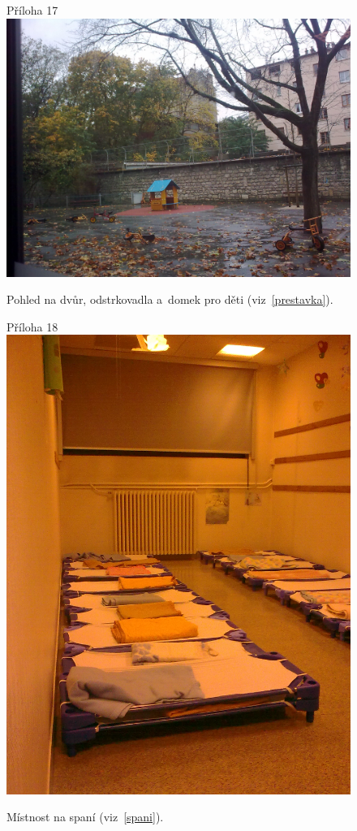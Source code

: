 	\begin{figure}[tb]
		\centering
		Příloha 17\\
		\includegraphics[height=0.35\textheight]{./fotky/Obr17.jpg}
		\caption{
			Pohled na dvůr, odstrkovadla a~domek pro děti (viz~\ref{prestavka}).
		}
		\label{Obr17}
	\end{figure}

	\begin{figure}[tb]
		\centering
		Příloha 18\\
		\includegraphics[height=0.35\textheight]{./fotky/Obr18.jpg}
		\caption{
			Místnost na spaní (viz~\ref{spani}).
		}
		\label{Obr18}
	\end{figure}
	
